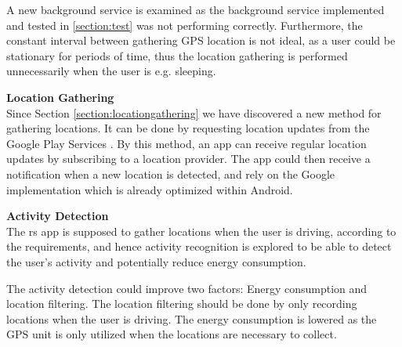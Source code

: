 A new background service is examined as the background service implemented and tested in \ref{section:test} was not performing correctly.
Furthermore, the constant interval between gathering GPS location is not ideal, as a user could be stationary for periods of time, thus the location gathering is performed unnecessarily when the user is e.g. sleeping.

\textbf{Location Gathering}\\
Since Section \ref{section:locationgathering} we have discovered a new method for gathering locations. 
It can be done by requesting location updates from the Google Play Services \cite{receivingLocationUpdates}.
By this method, an app can receive regular location updates by subscribing to a location provider.
The app could then receive a notification when a new location is detected, and rely on the Google implementation which is already optimized within Android.

\textbf{Activity Detection}\\
The \gls{rs} app is supposed to gather locations when the user is driving, according to the requirements, and hence activity recognition is explored to be able to detect the user's activity and potentially reduce energy consumption.

The activity detection could improve two factors: Energy consumption and location filtering.
The location filtering should be done by only recording locations when the user is driving.
The energy consumption is lowered as the GPS unit is only utilized when the locations are necessary to collect.
